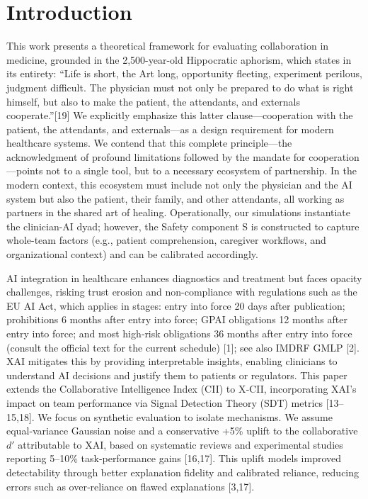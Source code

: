 \documentclass[11pt,a4paper]{article}
\begin{document}
\section{Introduction}
This work presents a theoretical framework for evaluating collaboration in medicine, grounded in the 2,500-year-old Hippocratic aphorism, which states in its entirety: ``Life is short, the Art long, opportunity fleeting, experiment perilous, judgment difficult. The physician must not only be prepared to do what is right himself, but also to make the patient, the attendants, and externals cooperate.''[19] We explicitly emphasize this latter clause---cooperation with the patient, the attendants, and externals---as a design requirement for modern healthcare systems. We contend that this complete principle---the acknowledgment of profound limitations followed by the mandate for cooperation---points not to a single tool, but to a necessary ecosystem of partnership. In the modern context, this ecosystem must include not only the physician and the AI system but also the patient, their family, and other attendants, all working as partners in the shared art of healing. Operationally, our simulations instantiate the clinician-AI dyad; however, the Safety component S is constructed to capture whole-team factors (e.g., patient comprehension, caregiver workflows, and organizational context) and can be calibrated accordingly.

AI integration in healthcare enhances diagnostics and treatment but faces opacity challenges, risking trust erosion and non-compliance with regulations such as the EU AI Act, which applies in stages: entry into force 20 days after publication; prohibitions 6 months after entry into force; GPAI obligations 12 months after entry into force; and most high‑risk obligations 36 months after entry into force (consult the official text for the current schedule) [1]; see also IMDRF GMLP [2]. XAI mitigates this by providing interpretable insights, enabling clinicians to understand AI decisions and justify them to patients or regulators. This paper extends the Collaborative Intelligence Index (CII) to X‑CII, incorporating XAI's impact on team performance via Signal Detection Theory (SDT) metrics [13–15,18]. We focus on synthetic evaluation to isolate mechanisms. We assume equal‑variance Gaussian noise and a conservative +5\% uplift to the collaborative $d'$ attributable to XAI, based on systematic reviews and experimental studies reporting 5--10\% task‑performance gains [16,17]. This uplift models improved detectability through better explanation fidelity and calibrated reliance, reducing errors such as over‑reliance on flawed explanations [3,17].
\end{document}
